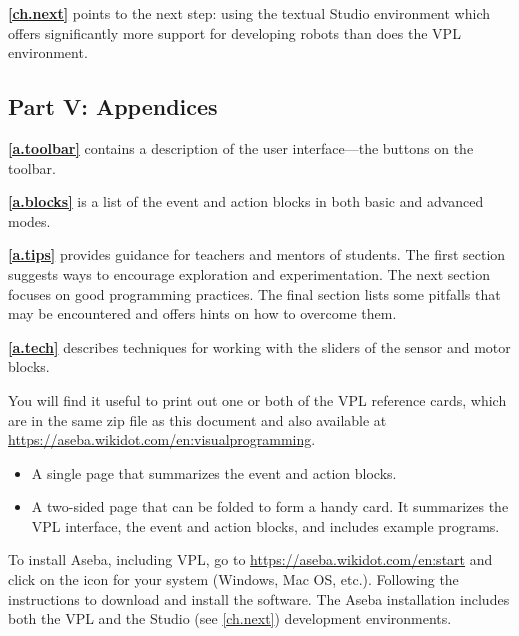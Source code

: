 \textbf{\cref{ch.next}} points to the next step: using the
textual Studio environment which offers significantly more support for
developing robots than does the VPL environment.


\subsection*{Part V: Appendices}

\textbf{\cref{a.toolbar}} contains a description of the user
interface---the buttons on the toolbar.

\textbf{\cref{a.blocks}} is a list of the event and
action blocks in both basic and advanced modes.

\textbf{\cref{a.tips}} provides guidance for teachers and
mentors of students. The first section suggests ways to encourage
exploration and experimentation. The next section focuses on good
programming practices. The final section lists some pitfalls that may be
encountered and offers hints on how to overcome them.

\textbf{\cref{a.tech}} describes techniques for working with the
sliders of the sensor and motor blocks.

 \quad {}



You will find it useful to print out one or both of the VPL reference cards,
which are in the same zip file as this document and also available
at \href{https://aseba.wikidot.com/en:visualprogramming}{https://aseba.wikidot.com/en:visualprogramming}.

\begin{itemize}
\item A single page that summarizes the event and action blocks.
\item A two-sided page that can be folded to form a handy card.
It summarizes the VPL interface, the event and action blocks,
and includes example programs.
\end{itemize}


To install Aseba, including VPL, go to
\href{https://aseba.wikidot.com/en:start}{https://aseba.wikidot.com/en:start}
and click on the icon for your system (Windows, Mac OS, etc.). Following
the instructions to download and install the software. The Aseba
installation includes both the VPL and the Studio (see \cref{ch.next})
development environments.
